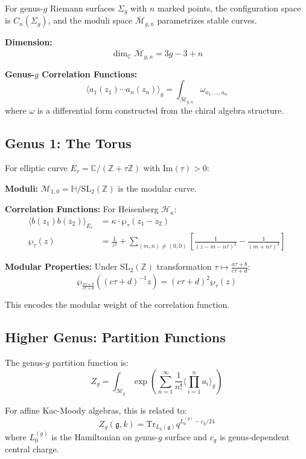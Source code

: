 For genus-$g$ Riemann surfaces $\Sigma_g$ with $n$ marked points, the configuration space is $C_n(\Sigma_g)$, and the moduli space $\overline{\mathcal{M}}_{g,n}$ parametrizes stable curves.

\textbf{Dimension:}
$$\dim_{\mathbb{C}} \overline{\mathcal{M}}_{g,n} = 3g - 3 + n$$

\textbf{Genus-$g$ Correlation Functions:}
$$\langle a_1(z_1) \cdots a_n(z_n) \rangle_g = \int_{\overline{\mathcal{M}}_{g,n}} \omega_{a_1,\ldots,a_n}$$
where $\omega$ is a differential form constructed from the chiral algebra structure.

\subsection{Genus 1: The Torus}

For elliptic curve $E_\tau = \mathbb{C}/(\mathbb{Z} + \tau\mathbb{Z})$ with $\text{Im}(\tau) > 0$:

\textbf{Moduli:} $\mathcal{M}_{1,0} = \mathbb{H}/\text{SL}_2(\mathbb{Z})$ is the modular curve.

\textbf{Correlation Functions:} For Heisenberg $\mathcal{H}_\kappa$:
\begin{align}
\langle b(z_1)b(z_2) \rangle_{E_\tau} &= \kappa \cdot \wp_\tau(z_1 - z_2) \\
\wp_\tau(z) &= \frac{1}{z^2} + \sum_{(m,n) \neq (0,0)} \left[\frac{1}{(z - m - n\tau)^2} - \frac{1}{(m+n\tau)^2}\right]
\end{align}

\textbf{Modular Properties:} Under $\text{SL}_2(\mathbb{Z})$ transformation $\tau \mapsto \frac{a\tau+b}{c\tau+d}$:
$$\wp_{\frac{a\tau+b}{c\tau+d}}((c\tau+d)^{-1}z) = (c\tau+d)^2 \wp_\tau(z)$$

This encodes the modular weight of the correlation function.

\subsection{Higher Genus: Partition Functions}

The genus-$g$ partition function is:
$$Z_g = \int_{\overline{\mathcal{M}}_g} \exp\left(\sum_{n=1}^\infty \frac{1}{n!} \langle \prod_{i=1}^n a_i \rangle_g\right)$$

For affine Kac-Moody algebras, this is related to:
$$Z_g(\mathfrak{g}, k) = \text{Tr}_{L_k(\mathfrak{g})} q^{L_0^{(g)} - c_g/24}$$
where $L_0^{(g)}$ is the Hamiltonian on genus-$g$ surface and $c_g$ is genus-dependent central charge.


